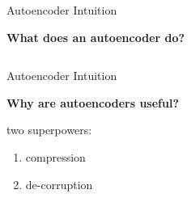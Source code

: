 \begin{frame}{Autoencoder Intuition}

\vspace{1ex}

{\Large
\textbf{What does an autoencoder do?}
}

\vspace{2ex}

\begin{figure}


\begin{columns}
\begin{column}{0.4\textwidth}
\end{column}
\begin{column}{0.2\textwidth}
\end{column}
\begin{column}{0.4\textwidth}
\end{column}
\end{columns}
\vspace{1ex}

\begin{columns}
\begin{column}{0.4\textwidth}
\end{column}
\begin{column}{0.2\textwidth}
\end{column}
\begin{column}{0.4\textwidth}
\end{column}
\end{columns}

\vspace{2ex}
\end{figure}

\end{frame}

\begin{frame}{Autoencoder Intuition}

{\Large
\textbf{Why are autoencoders useful?}
}

\pause

\vspace{4ex}

{\Large
two superpowers:

\pause

\begin{enumerate}

\item compression 

\pause

\item de-corruption 

\end{enumerate}
}

\end{frame}

